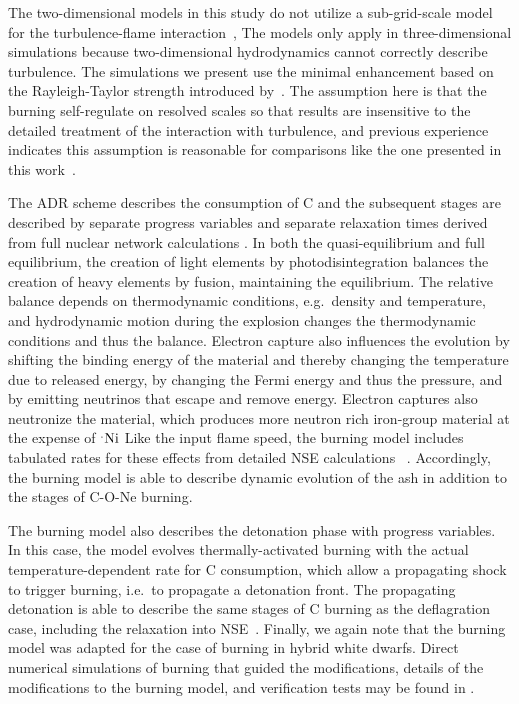 \documentclass[iop,apj]{emulateapj}
\newcommand{\Ni}[1]{\ensuremath{{}^{#1}{\rm Ni}}}
\begin{document}
The two-dimensional models in this study do not utilize a sub-grid-scale
model for the turbulence-flame 
interaction~\citep[See][for examples]{Schmetal06a,Schmetal06b,jacketal2014},
The models only apply in three-dimensional
simulations because two-dimensional hydrodynamics cannot
correctly describe turbulence. The simulations we present
use the minimal enhancement based on the Rayleigh-Taylor
strength introduced by~\citet{townsley.calder.ea:flame}. The
assumption here is that the burning self-regulate on resolved 
scales so that results are insensitive to the detailed treatment 
of the interaction with turbulence, and previous experience
indicates this assumption is reasonable for comparisons
like the one presented in this work~\citet{townsley.calder.ea:flame,
willcoxetal2016}. 

The ADR scheme describes the consumption of C and the subsequent stages
are described by separate progress variables and
separate relaxation times derived from full nuclear network calculations
\cite{Caldetal07,townetal2016}. In both the quasi-equilibrium and full equilibrium, 
the creation of light elements by photodisintegration balances the creation of heavy 
elements by fusion, maintaining the equilibrium. The relative balance depends on
thermodynamic conditions, e.g.\ density and temperature, and hydrodynamic motion
during the explosion changes the thermodynamic conditions and thus the
balance. Electron capture also influences the evolution by shifting the binding 
energy of the material and thereby changing the temperature due to released energy, 
by changing the Fermi energy and thus the pressure, and by emitting neutrinos that 
escape and remove energy. Electron captures also neutronize the material, which 
produces more neutron rich iron-group material at the expense of \Ni. Like the 
input flame speed, the burning model includes tabulated rates for these effects 
from detailed NSE calculations ~\cite{SeitTownetal09}. Accordingly, the burning
model is able to describe dynamic evolution of the ash in addition to the 
stages of C-O-Ne burning.

The burning model also describes the detonation phase with progress variables.  
In this case, the model evolves thermally-activated burning with the actual
temperature-dependent rate for C consumption, which allow a propagating shock to
trigger burning, i.e.\ to propagate a detonation front. The propagating detonation 
is able to describe the same stages of C burning as the deflagration case, including 
the relaxation into NSE~\cite[and references therein]{townetal2016}. Finally,
we again note that the burning model was adapted for the case of burning in
hybrid white dwarfs. Direct numerical simulations of burning that guided 
the modifications, details of the modifications to the burning model, and
verification tests may be found in \citet{willcoxetal2016}.
\end{document}
